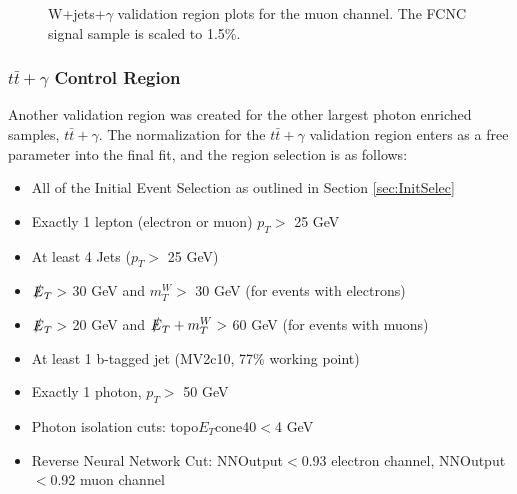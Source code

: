 \begin{figure}[h!]
\hfil  %
\caption{W+jets+$\gamma$ validation region plots for the muon channel.  The FCNC signal sample is scaled to 1.5\%.} %
\label{fig:VR1muj}
\end{figure}

\subsubsection{$t\bar{t}+\gamma$ Control Region}
Another validation region was created for the other largest photon enriched samples, $t\bar{t}+\gamma$. The normalization for the $t\bar{t}+\gamma$ validation region enters as a free parameter into the final fit, and the region selection is as follows:
\begin{itemize}
\item All of the Initial Event Selection as outlined in Section \ref{sec:InitSelec}
\item Exactly 1 lepton (electron or muon) $p_T >$ 25 GeV
\item At least 4 Jets  ($p_T >$ 25 GeV) 
\item $\slashed{E}_T >$ 30 GeV and $m_T^W >$ 30 GeV (for events with electrons)
\item $\slashed{E}_T >$ 20 GeV and $\slashed{E}_T + m_T^W >$ 60 GeV (for events with muons)
\item At least 1 b-tagged jet (MV2c10, 77\% working point)
\item Exactly 1 photon, $p_T >$ 50 GeV
\item Photon isolation cuts: topo$E_T$cone40$<$4 GeV
\item Reverse Neural Network Cut: NNOutput$<$0.93 electron channel, NNOutput$<$0.92 muon channel
\end{itemize}

